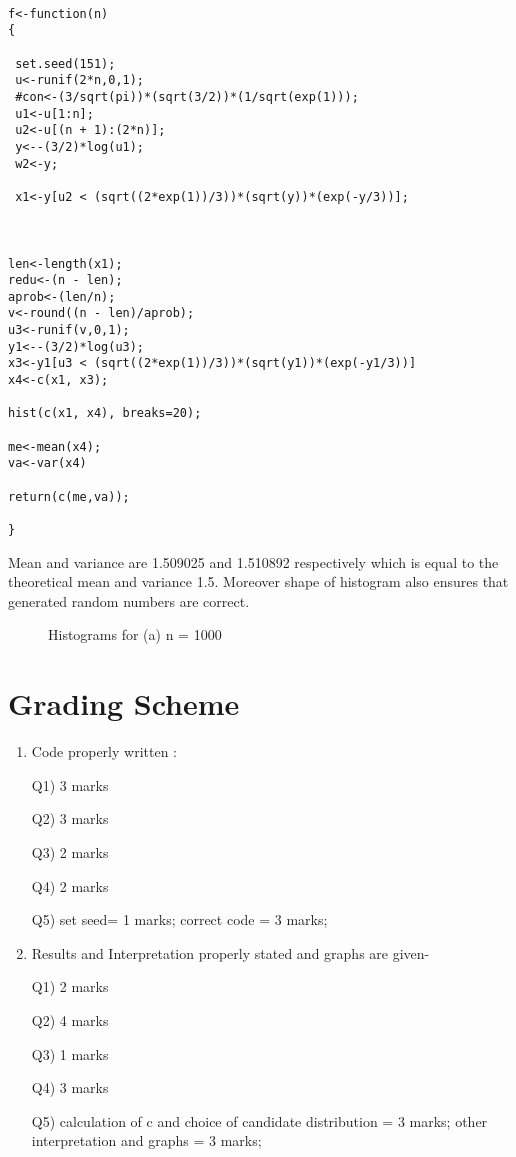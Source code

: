 \documentclass[11pt]{article}
\begin{document}
\begin{lstlisting}

f<-function(n)
{

 set.seed(151);
 u<-runif(2*n,0,1);
 #con<-(3/sqrt(pi))*(sqrt(3/2))*(1/sqrt(exp(1))); 
 u1<-u[1:n];
 u2<-u[(n + 1):(2*n)]; 
 y<--(3/2)*log(u1);
 w2<-y;
  
 x1<-y[u2 < (sqrt((2*exp(1))/3))*(sqrt(y))*(exp(-y/3))];



len<-length(x1);
redu<-(n - len);
aprob<-(len/n);
v<-round((n - len)/aprob);
u3<-runif(v,0,1);
y1<--(3/2)*log(u3);
x3<-y1[u3 < (sqrt((2*exp(1))/3))*(sqrt(y1))*(exp(-y1/3))]
x4<-c(x1, x3);

hist(c(x1, x4), breaks=20);

me<-mean(x4);
va<-var(x4)

return(c(me,va)); 

}

\end{lstlisting}


Mean and variance are 1.509025 and 1.510892 respectively which is equal to the theoretical mean and variance 1.5.  Moreover shape of histogram also ensures that generated random numbers are correct.


\begin{figure}[H]
  \centering
  \caption{Histograms for (a) n = 1000}
\end{figure}
 


\section{Grading Scheme}

\begin{enumerate}
\item Code properly written :

Q1)  3 marks

Q2)  3 marks

Q3) 2 marks

Q4) 2 marks

Q5) set seed= 1 marks; correct code = 3 marks;


\item Results and Interpretation properly stated and graphs are given-

Q1) 2 marks

Q2) 4 marks

Q3) 1 marks

Q4) 3 marks

Q5) calculation of c and choice of candidate distribution = 3 marks; other interpretation and graphs = 3 marks; 


\end{enumerate}
\end{document}
